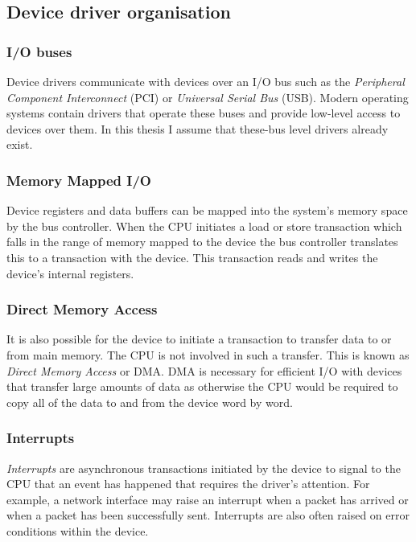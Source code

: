 \subsection{Device driver organisation}
\subsubsection{I/O buses}

Device drivers communicate with devices over an I/O bus such as the \emph{Peripheral Component Interconnect} (PCI) or \emph{Universal Serial Bus} (USB). Modern operating systems contain drivers that operate these buses and provide low-level access to devices over them. In this thesis I assume that these-bus level drivers already exist. 

\subsubsection{Memory Mapped I/O}

Device registers and data buffers can be mapped into the system's memory space by the bus controller. When the CPU initiates a load or store transaction which falls in the range of memory mapped to the device the bus controller translates this to a transaction with the device. This transaction reads and writes the device's internal registers.

\subsubsection{Direct Memory Access}

It is also possible for the device to initiate a transaction to transfer data to or from main memory. The CPU is not involved in such a transfer. This is known as \emph{Direct Memory Access} or DMA. DMA is necessary for efficient I/O with devices that transfer large amounts of data as otherwise the CPU would be required to copy all of the data to and from the device word by word.

\subsubsection{Interrupts}

\emph{Interrupts} are asynchronous transactions initiated by the device to signal to the CPU that an event has happened that requires the driver's attention. For example, a network interface may raise an interrupt when a packet has arrived or when a packet has been successfully sent. Interrupts are also often raised on error conditions within the device.

